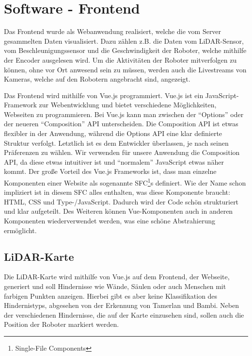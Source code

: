 
\section{Software - Frontend}
\label{sec:software_frontend}
Das Frontend wurde als Webanwendung realisiert,
welche die vom Server gesammelten Daten visualisiert.
%
Dazu zählen z.B. die Daten vom LiDAR-Sensor,
vom Beschleunigungssensor
und die Geschwindigkeit der Roboter,
welche mithilfe der Encoder ausgelesen wird.
%
Um die Aktivitäten der Roboter mitverfolgen zu können,
ohne vor Ort anwesend sein zu müssen,
werden auch die Livestreams von Kameras,
welche auf den Robotern angebracht sind,
angezeigt.

Das Frontend wird mithilfe von Vue.js programmiert.
%
Vue.js ist ein JavaScript-Framework zur Webentwicklung
und bietet verschiedene Möglichkeiten,
Webseiten zu programmieren.
%
Bei Vue.js kann man zwischen der ``Options'' oder
der neueren ``Composition'' API unterscheiden.
%
Die Composition API ist etwas flexibler in der Anwendung,
während die Options API eine klar definierte Struktur verfolgt.
%
Letztlich ist es dem Entwickler überlassen,
je nach seinen Präferenzen zu wählen.
%
Wir verwenden für unsere Anwendung die Composition API,
da diese etwas intuitiver ist
und ``normalem'' JavaScript etwas näher kommt. 
%
Der große Vorteil des Vue.js Frameworks ist,
dass man einzelne Komponenten einer Website
als sogenannte SFC\footnote{Single-File Components}s definiert.
%
Wie der Name schon impliziert ist in diesem SFC alles enthalten,
was diese Komponente braucht: HTML, CSS und Type-/JavaScript.
%
Dadurch wird der Code schön strukturiert und klar aufgeteilt.
%
Des Weiteren können Vue-Komponenten auch
in anderen Komponenten wiederverwendet werden,
was eine schöne Abstrahierung ermöglicht.

\subsection{LiDAR-Karte}
\label{subsec:frontend_lidar_map}
Die LiDAR-Karte wird mithilfe von Vue.js auf dem Frontend,
der Webseite,
generiert und soll Hindernisse wie Wände,
Säulen oder auch Menschen mit farbigen Punkten anzeigen.
%
Hierbei gibt es aber keine Klassifikation des Hindernistyps,
abgesehen von der Erkennung von Tamerlan und Bambi.
%
Neben der verschiedenen Hindernisse,
die auf der Karte einzusehen sind,
sollen auch die Position der Roboter markiert werden.

